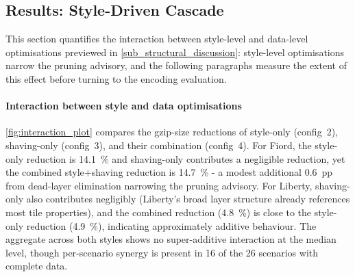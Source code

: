 \subsection{Results: Style-Driven Cascade}\label{sub_mlt_results}

This section quantifies the interaction between style-level and data-level optimisations previewed in \cref{sub_structural_discussion}: style-level optimisations narrow the pruning advisory, and the following paragraphs measure the extent of this effect before turning to the encoding evaluation.

\paragraph{Interaction between style and data optimisations}
\cref{fig:interaction_plot} compares the gzip-size reductions of style-only (config~2), shaving-only (config~3), and their combination (config~4).
For Fiord, the style-only reduction is \qty{14.1}{\percent} and shaving-only contributes a negligible reduction, yet the combined style+shaving reduction is \qty{14.7}{\percent} - a modest additional \qty{0.6}{pp} from dead-layer elimination narrowing the pruning advisory.
For Liberty, shaving-only also contributes negligibly (Liberty's broad layer structure already references most tile properties), and the combined reduction (\qty{4.8}{\percent}) is close to the style-only reduction (\qty{4.9}{\percent}), indicating approximately additive behaviour.
The aggregate across both styles shows no super-additive interaction at the median level, though per-scenario synergy is present in 16 of the 26 scenarios with complete data.

